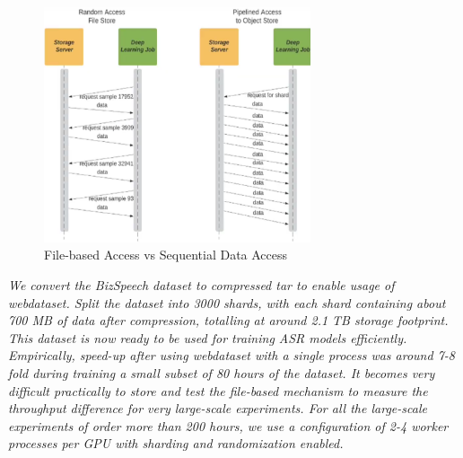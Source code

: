 \begin{figure}[ht]
  \begin{center}
    \includegraphics[width=0.7\textwidth]{images/sequential.png} 
    \caption{File-based Access vs Sequential Data Access \cite{Aizman2019HighLearning}}
    \label{fig:seq}
  \end{center}
\end{figure}

\emph{We convert the BizSpeech dataset  to compressed tar to enable usage of webdataset. Split the dataset into 3000 shards, with each shard containing about 700 MB of data after compression, totalling at around 2.1 TB storage footprint. This dataset is now ready to be used for training ASR models efficiently. Empirically, speed-up after using webdataset with a single process was around 7-8 fold during training a small subset of 80 hours of the dataset. It becomes very difficult practically to store and test the file-based mechanism to measure the throughput difference for very large-scale experiments. For all the large-scale experiments of order more than 200 hours, we use a configuration of 2-4 worker processes per GPU with sharding and randomization enabled.}

